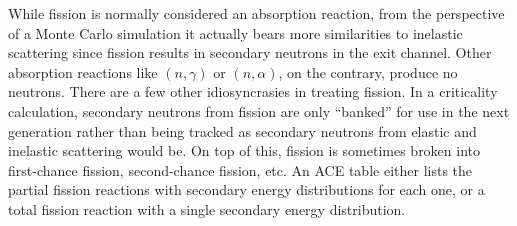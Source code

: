 While fission is normally considered an absorption reaction, from the
perspective of a Monte Carlo simulation it actually bears more similarities to
inelastic scattering since fission results in secondary neutrons in the exit
channel. Other absorption reactions like $(n,\gamma)$ or $(n,\alpha)$, on the
contrary, produce no neutrons. There are a few other idiosyncrasies in treating
fission. In a criticality calculation, secondary neutrons from fission are only
``banked'' for use in the next generation rather than being tracked as secondary
neutrons from elastic and inelastic scattering would be. On top of this, fission
is sometimes broken into first-chance fission, second-chance fission, etc. An
ACE table either lists the partial fission reactions with secondary energy
distributions for each one, or a total fission reaction with a single secondary
energy distribution.

